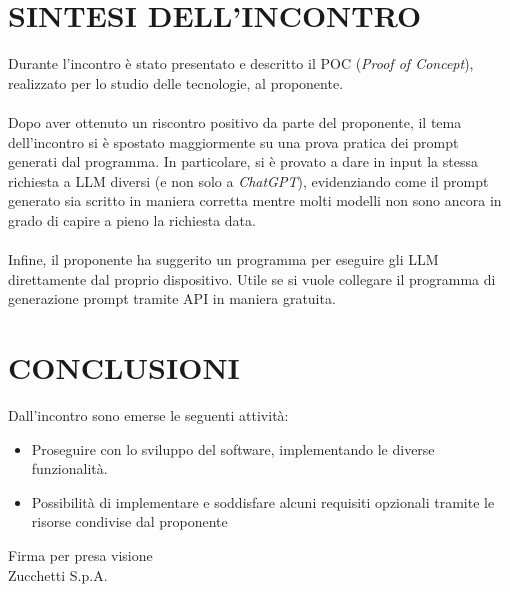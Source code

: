\documentclass[5pt]{article}
\begin{document}
\section{SINTESI DELL'INCONTRO}
Durante l'incontro è stato presentato e descritto il POC (\textit{Proof of Concept}), realizzato per lo studio delle tecnologie, al proponente.\\ \\
Dopo aver ottenuto un riscontro positivo da parte del proponente, il tema dell'incontro si è spostato maggiormente su una prova pratica dei prompt generati dal programma. In particolare, si è provato a dare in input la stessa richiesta a LLM diversi (e non solo a \textit{ChatGPT}), evidenziando come il prompt generato sia scritto in maniera corretta mentre molti modelli non sono ancora in grado di capire a pieno la richiesta data.\\ \\
Infine, il proponente ha suggerito un programma per eseguire gli LLM direttamente dal proprio dispositivo. Utile se si vuole collegare il programma di generazione prompt tramite API in maniera gratuita.

\section{CONCLUSIONI}
Dall'incontro sono emerse le seguenti attività: 
\begin{itemize}
    \item Proseguire con lo sviluppo del software, implementando le diverse funzionalità.
    \item Possibilità di implementare e soddisfare alcuni requisiti opzionali tramite le risorse condivise dal proponente
\end{itemize}

\vspace{3em}
\begin{flushright}
	\begin{spacing}{1.5}
		Firma per presa visione\\
		Zucchetti S.p.A.
	\end{spacing}
\end{flushright}
\end{document}
